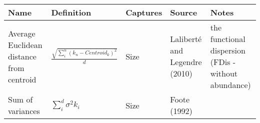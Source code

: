 \documentclass[]{article}
\begin{document}
\begin{longtable}[]{@{}lllll@{}}
\toprule
\begin{minipage}[b]{0.17\columnwidth}\raggedright\strut
Name\strut
\end{minipage} & \begin{minipage}[b]{0.25\columnwidth}\raggedright\strut
Definition\strut
\end{minipage} & \begin{minipage}[b]{0.09\columnwidth}\raggedright\strut
Captures\strut
\end{minipage} & \begin{minipage}[b]{0.09\columnwidth}\raggedright\strut
Source\strut
\end{minipage} & \begin{minipage}[b]{0.25\columnwidth}\raggedright\strut
Notes\strut
\end{minipage}\tabularnewline
\midrule
\endhead
\begin{minipage}[t]{0.17\columnwidth}\raggedright\strut
Average Euclidean distance from centroid\strut
\end{minipage} & \begin{minipage}[t]{0.25\columnwidth}\raggedright\strut
\(\frac{\sqrt{\sum_{i}^{n}{({k}_{n}-Centroid_{k})^2}}}{d}\)\strut
\end{minipage} & \begin{minipage}[t]{0.09\columnwidth}\raggedright\strut
Size\strut
\end{minipage} & \begin{minipage}[t]{0.09\columnwidth}\raggedright\strut
Laliberté and Legendre (2010)\strut
\end{minipage} & \begin{minipage}[t]{0.25\columnwidth}\raggedright\strut
the functional dispersion (FDis - without abundance)\strut
\end{minipage}\tabularnewline
\begin{minipage}[t]{0.17\columnwidth}\raggedright\strut
Sum of variances\strut
\end{minipage} & \begin{minipage}[t]{0.25\columnwidth}\raggedright\strut
\(\sum_{i}^{d}{\sigma^{2}{k_i}}\)\strut
\end{minipage} & \begin{minipage}[t]{0.09\columnwidth}\raggedright\strut
Size\strut
\end{minipage} & \begin{minipage}[t]{0.09\columnwidth}\raggedright\strut
Foote (1992)\strut
\end{minipage} & \begin{minipage}[t]{0.25\columnwidth}\raggedright\strut

\end{minipage}
\end{longtable}
\end{document}
